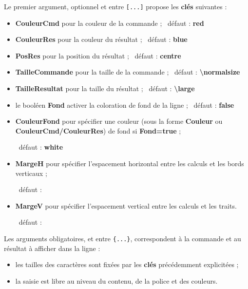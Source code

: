 \documentclass[french,a4paper,11pt]{article}
\newcommand\Cle[1]{{\bfseries\sffamily\textlangle #1\textrangle}}
\begin{document}
\begin{tipblock}
Le premier argument, optionnel et entre \texttt{[...]} propose les \Cle{clés} suivantes :

\begin{itemize}
	\item \Cle{CouleurCmd} pour la couleur de la commande ; \hfill~défaut : \Cle{red}
	\item \Cle{CouleurRes} pour la couleur du résultat ; \hfill~défaut : \Cle{blue}
	\item \Cle{PosRes} pour la position du résultat ; \hfill~défaut : \Cle{centre}
	\item \Cle{TailleCommande} pour la taille de la commande ; \hfill~défaut : \Cle{\textbackslash normalsize}
	\item \Cle{TailleResultat} pour la taille du résultat ; \hfill~défaut : \Cle{\textbackslash large}
	\item le booléen \Cle{Fond} activer la coloration de fond de la ligne ; \hfill~défaut : \Cle{false}
	\item \Cle{CouleurFond} pour spécifier une couleur (sous la forme \Cle{Couleur} ou \Cle{CouleurCmd/CouleurRes}) de fond si \Cle{Fond=true} ;
	
	\hfill~défaut : \Cle{white}
	\item \Cle{MargeH} pour spécifier l'espacement horizontal entre les calculs et les bords verticaux ;
	
	\hfill~défaut : \Cle{0.15}
	\item \Cle{MargeV} pour spécifier l'espacement vertical entre les calculs et les traits.
	
	\hfill~défaut : \Cle{6pt}
\end{itemize}
\vspace*{-\baselineskip}\leavevmode
\end{tipblock}

\begin{tipblock}
Les arguments obligatoires, et entre \texttt{\{...\}}, correspondent à la commande et au résultat à afficher dans la ligne :

\begin{itemize}
	\item les tailles des caractères sont fixées par les \Cle{clés} précédemment explicitées ;
	\item la saisie est libre au niveau du contenu, de la police et des couleurs.
\end{itemize}
\end{tipblock}
\end{document}
